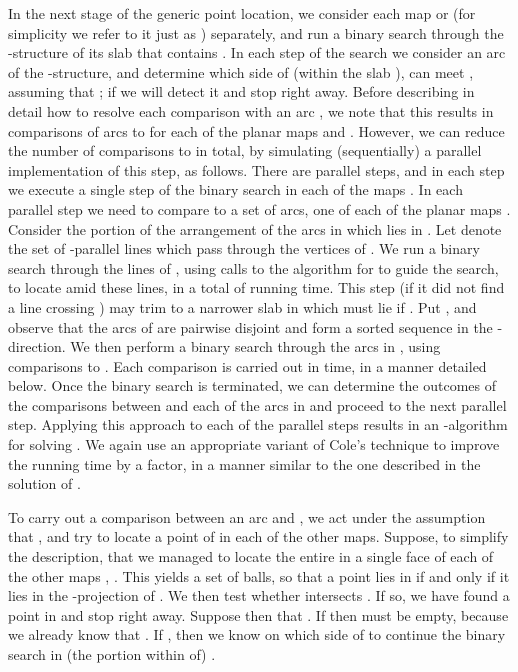 \documentclass[a4paper,12pt]{article}
\begin{document}
In the next stage of the generic point location, we consider each
map  or  (for simplicity we refer to it just as )
separately, and run a binary search through the -structure of its
slab  that contains . In each step of the search we
consider an arc  of the -structure, and determine which
side of  (within the slab ), can meet , assuming
that ; if  we will detect it and stop right away. Before describing
in detail how to resolve each comparison with an arc , we
note that this results in  comparisons of arcs 
to  for each of the  planar maps  and
. However, we can reduce the number of comparisons to  in total, by simulating (sequentially) a parallel implementation
of this step, as follows. There are  parallel steps, and
in each step we execute a single step of the binary search in each
of the maps . In each parallel step we need to compare
 to a set  of  arcs, one of each of the planar
maps . Consider the portion  of the
arrangement  of the arcs in  which lies in . Let
 denote the set of  -parallel lines which pass
through the vertices of . We run a binary search through the
lines of , using calls to the algorithm for  to guide
the search, to locate  amid these lines, in a total of
 running time. This step (if it did not
find a line crossing ) may trim  to a narrower slab
 in which  must lie if . Put , and observe that the arcs
of  are pairwise disjoint and form a sorted sequence in the
-direction. We then perform a binary search through the arcs in
, using  comparisons to . Each comparison
is carried out in  time, in a manner detailed below.
Once the binary search is terminated, we can determine the outcomes
of the comparisons between  and each of the arcs in  and
proceed to the next parallel step. Applying this approach to each of
the  parallel steps results in an -algorithm for solving . We again use an appropriate
variant of Cole's technique to improve the running time by a  factor, in a manner similar to the one described in the
solution of .

To carry out a comparison between an arc  and ,
we act under the assumption that ,
and try to locate a point of  in each of the other
maps. Suppose, to simplify the description, that we managed to
locate the entire  in a single face of each of the other
maps , . This yields a set  of  balls, so
that a point  lies in  if and only if it lies in
the -projection  of . We then test whether
 intersects . If so, we have found a point in  and
stop right away. Suppose then that .
If  then  must be empty, because we
already know that . If , then we know on which side of  to continue the
binary search in (the portion within  of) .
\end{document}
